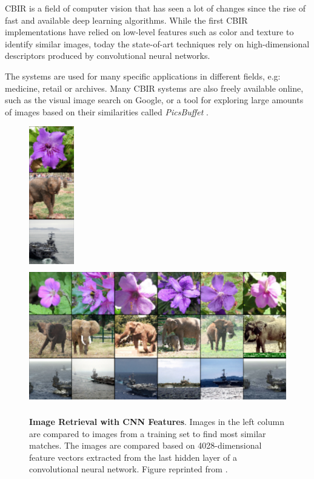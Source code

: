 \documentclass[12pt]{report}
\begin{document}
CBIR is a field of computer vision that has seen a lot of changes since the rise of fast and available deep learning algorithms. While the first CBIR implementations have relied on low-level features such as color and texture to identify similar images, today the state-of-art techniques rely on high-dimensional descriptors produced by convolutional neural networks.

The systems are used for many specific applications in different fields, e.g: medicine, retail or archives. Many CBIR systems are also freely available online, such as the visual image search on Google, or a tool for exploring large amounts of images based on their similarities called \textit{PicsBuffet} \cite{mackowiak_picsbuffet_nodate}.


\begin{figure}[h]
\centering
{\includegraphics[height=6cm]{02_background/CBIR/cnn_cbir_input}}
{\includegraphics[height=6cm]{02_background/CBIR/cnn_cbir_retrieval}}
\caption{\label{fig:conv_cbir} \textbf{Image Retrieval with CNN Features}. Images in the left column are compared to images from a training set to find most similar matches. The images are compared based on 4028-dimensional feature vectors extracted from the last hidden layer of a convolutional neural network. Figure reprinted from \cite{NIPS2012_4824}.}
\end{figure}
\end{document}
